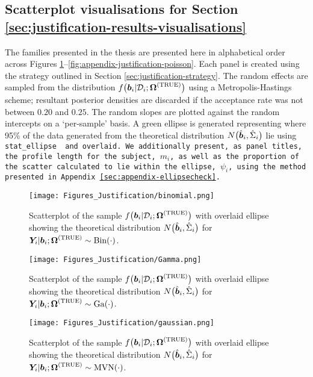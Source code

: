 \subsection{Scatterplot visualisations for Section \ref{sec:justification-results-visualisations}}\label{sec:appendix-suppfigs-justification-viz}
The families presented in the thesis are presented here in alphabetical order across Figures \ref{fig:appendix-justification-binomial}--\ref{fig:appendix-justification-poisson}. Each panel is created using the strategy outlined in Section \ref{sec:justification-strategy}. The random effects are sampled from the distribution $f\big(\bm{b}_i|\mathcal{D}_i;\bm{\mathrm{\Omega}}^{(\mathrm{TRUE})}\big)$ using a Metropolis-Hastings scheme; resultant posterior densities are discarded if the acceptance rate was not between $0.20$ and $0.25$. The random slopes are plotted against the random intercepts on a `per-sample' basis. A green ellipse is generated representing where 95\% of the data generated from the theoretical distribution $N\big(\hat{\bm{b}}_i,\hat{\Sigma}_i\big)$ lie using \tt{stat\_ellipse} \citep{R-ggplot2} and overlaid. We additionally present, as panel titles, the profile length for the subject, $m_i$, as well as the proportion of the scatter calculated to lie within the ellipse, $\psi_i$, using the method presented in Appendix \ref{sec:appendix-ellipsecheck}.
\thispagestyle{empty}
\begin{landscape}
\begin{figure}
    \centering
    \texttt{[image: Figures\_Justification/binomial.png]}
    \caption{Scatterplot of the sample $f\big(\bm{b}_i|\mathcal{D}_i;\bm{\mathrm{\Omega}}^{(\mathrm{TRUE})}\big)$ with overlaid ellipse showing the theoretical distribution $N\big(\hat{\bm{b}}_i,\hat{\Sigma}_i\big)$ for $\bm{Y}_i|\bm{b}_i;\bm{\mathrm{\Omega}}^{(\mathrm{TRUE})}\sim\mathrm{Bin}\!\left(\cdot\right)$.}
    \label{fig:appendix-justification-binomial}
\end{figure}
\vfill
\lscapepageno
\end{landscape}
\clearpage
\thispagestyle{empty}
\begin{landscape}
\begin{figure}
    \centering
    \texttt{[image: Figures\_Justification/Gamma.png]}
    \caption{Scatterplot of the sample $f\big(\bm{b}_i|\mathcal{D}_i;\bm{\mathrm{\Omega}}^{(\mathrm{TRUE})}\big)$ with overlaid ellipse showing the theoretical distribution $N\big(\hat{\bm{b}}_i,\hat{\Sigma}_i\big)$ for $\bm{Y}_i|\bm{b}_i;\bm{\mathrm{\Omega}}^{(\mathrm{TRUE})}\sim\mathrm{Ga}\!\left(\cdot\right)$.}
    \label{fig:appendix-justification-Gamma}
\end{figure}
\vfill
\lscapepageno
\end{landscape}
\clearpage
\thispagestyle{empty}
\begin{landscape}
\begin{figure}
    \centering
    \texttt{[image: Figures\_Justification/gaussian.png]}
    \caption{Scatterplot of the sample $f\big(\bm{b}_i|\mathcal{D}_i;\bm{\mathrm{\Omega}}^{(\mathrm{TRUE})}\big)$ with overlaid ellipse showing the theoretical distribution $N\big(\hat{\bm{b}}_i,\hat{\Sigma}_i\big)$ for $\bm{Y}_i|\bm{b}_i;\bm{\mathrm{\Omega}}^{(\mathrm{TRUE})}\sim\mathrm{MVN}\!\left(\cdot\right)$.}
    \label{fig:appendix-justification-gaussian}
\end{figure}
\vfill
\lscapepageno
\end{landscape}
